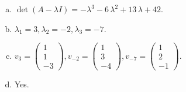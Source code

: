 \begin{questions}
\begin{solution}
\begin{enumerate}[(a)]
\item $\det(A-\lambda I)=-{\lambda}^{3} - 6 \, {\lambda}^{2} + 13 \, {\lambda} + 42$.
\item ${\lambda}_1=3, {\lambda}_2=-2, {\lambda}_3=-7$.
\item $v_{3}=\left(\begin{array}{r}
1 \\
1 \\
-3
\end{array}\right), v_{-2}=\left(\begin{array}{r}
1 \\
3 \\
-4
\end{array}\right), v_{-7}=\left(\begin{array}{r}
1 \\
2 \\
-1
\end{array}\right)$.
\item Yes.
\end{enumerate}
\end{solution}

\end{questions}

\newpage


\begin{center}
\end{center}


